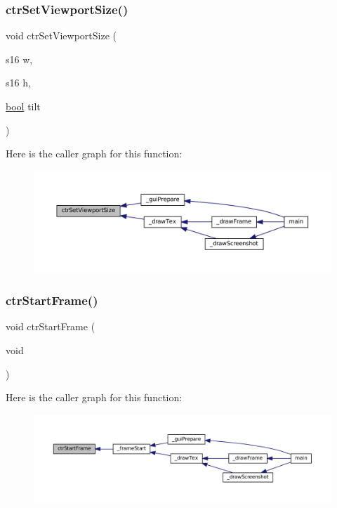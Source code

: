 \subsubsection{\texorpdfstring{ctr\+Set\+Viewport\+Size()}{ctrSetViewportSize()}}
{\footnotesize\ttfamily void ctr\+Set\+Viewport\+Size (\begin{DoxyParamCaption}\item[{s16}]{w,  }\item[{s16}]{h,  }\item[{\mbox{\hyperlink{libretro_8h_a4a26dcae73fb7e1528214a068aca317e}{bool}}}]{tilt }\end{DoxyParamCaption})}

Here is the caller graph for this function\+:
\nopagebreak
\begin{figure}[H]
\begin{center}
\leavevmode
\includegraphics[width=350pt]{ctr-gpu_8h_a10edf7402a10780992aef77c359f99b4_icgraph}
\end{center}
\end{figure}
\mbox{\label{ctr-gpu_8h_a862d2bcd425f4872ebfd58274e948057}} 
\subsubsection{\texorpdfstring{ctr\+Start\+Frame()}{ctrStartFrame()}}
{\footnotesize\ttfamily void ctr\+Start\+Frame (\begin{DoxyParamCaption}\item[{void}]{ }\end{DoxyParamCaption})}

Here is the caller graph for this function\+:
\nopagebreak
\begin{figure}[H]
\begin{center}
\leavevmode
\includegraphics[width=350pt]{ctr-gpu_8h_a862d2bcd425f4872ebfd58274e948057_icgraph}
\end{center}
\end{figure}
\mbox{\label{ctr-gpu_8h_ae1021d5113537160c2b2122305ac6980}} 
